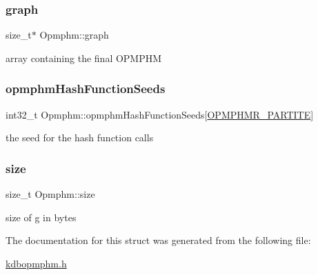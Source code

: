 \subsubsection{\texorpdfstring{graph}{graph}}
{\footnotesize\ttfamily size\+\_\+t$\ast$ Opmphm\+::graph}

array containing the final O\+P\+M\+P\+HM \mbox{\label{structOpmphm_af43b9994fa7db2d16abc682b1a6c3aa3}} 
\subsubsection{\texorpdfstring{opmphm\+Hash\+Function\+Seeds}{opmphmHashFunctionSeeds}}
{\footnotesize\ttfamily int32\+\_\+t Opmphm\+::opmphm\+Hash\+Function\+Seeds\mbox{[}\hyperlink{kdbopmphm_8h_ad241eace4050c6fcdab0da1919a79d93}{O\+P\+M\+P\+H\+M\+R\+\_\+\+P\+A\+R\+T\+I\+TE}\mbox{]}}

the seed for the hash function calls \mbox{\label{structOpmphm_a72e7343b4ea87b27891e760f03fd2b96}} 
\subsubsection{\texorpdfstring{size}{size}}
{\footnotesize\ttfamily size\+\_\+t Opmphm\+::size}

size of g in bytes 

The documentation for this struct was generated from the following file\+:\begin{DoxyCompactItemize}
\item 
\hyperlink{kdbopmphm_8h}{kdbopmphm.\+h}\end{DoxyCompactItemize}
